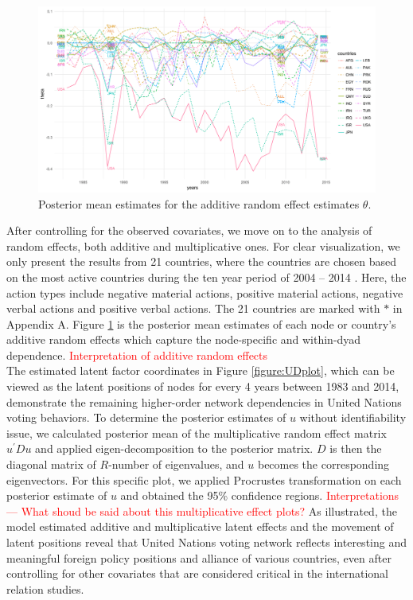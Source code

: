 \documentclass[a4paper]{article}
\begin{document}
 \begin{figure}[ht]
 	\begin{center}
 		\includegraphics[width=1\textwidth]{plots_paper/thetaplot-1.png}	
 	\end{center}
 	\caption {Posterior mean estimates for the additive random effect estimates $\theta$.}
 	\label{figure:thetaplot}
 \end{figure}
\noindent After controlling for the observed covariates, we move on to the analysis of random effects, both additive and multiplicative ones. For clear visualization, we only present the results from 21 countries, where the countries are chosen based on the most active countries during the ten year period of 2004 -- 2014 \citep{hoff2015multilinear}. Here, the action types include negative material actions, positive material actions, negative verbal actions and positive verbal actions. The 21 countries are marked with $*$ in Appendix A. Figure \ref{figure:thetaplot} is the posterior mean estimates of each node or country's additive random effects which capture the node-specific and within-dyad dependence. \textcolor{red}{Interpretation of additive random effects}\\ \newpage
\noindent The estimated latent factor coordinates in Figure \ref{figure:UDplot}, which can be viewed as the latent positions of nodes for every 4 years between 1983 and 2014, demonstrate the remaining higher-order network dependencies in United Nations voting behaviors. To determine the posterior estimates of $u$ without identifiability issue, we calculated posterior mean of the multiplicative random effect matrix $u^\prime Du$ and applied eigen-decomposition to the posterior matrix. $D$ is then the diagonal matrix of $R$-number of eigenvalues, and $u$ becomes the corresponding eigenvectors. For this specific plot, we applied Procrustes transformation on each posterior estimate of $u$ and obtained the 95\% confidence regions. \textcolor{red}{Interpretations --- What shoud be said about this multiplicative effect plots?} As illustrated, the model estimated additive and multiplicative latent effects and the movement of latent positions reveal that United Nations voting network reflects interesting and meaningful foreign policy positions and alliance of various countries, even after controlling for other covariates that are considered critical in the international relation studies.
\end{document}
